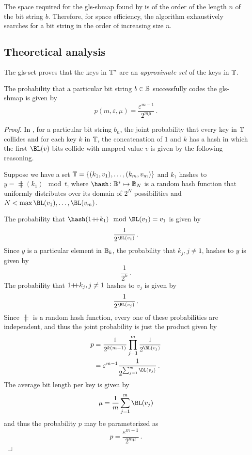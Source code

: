 \documentclass[ ../main.tex]{subfiles}
\begin{document}
The space required for the \gls{gls-shmap} found by  is of the order of the length $n$ of the bit string $b$. Therefore, for space efficiency, the algorithm exhaustively searches for a bit string in the order of increasing size $n$.

\subsection{Theoretical analysis}
The \gls{gls-set} proves that the keys in $\mathbb{T}^*$ are an \emph{approximate set} of the keys in $\mathbb{T}$.

\begin{theorem}
The probability that a particular bit string $b \in \mathbb{B}$ successfully codes the \gls{gls-shmap} is given by
\begin{equation}
    p(m,\varepsilon,\mu) = \frac{\varepsilon^{m-1}}{2^{m \mu}}\,.
\end{equation}
\end{theorem}
\begin{proof}
In , for a particular bit string $b_n$, the joint probability that every key in $\mathbb{T}$ collides and for each key $k$ in $\mathbb{T}$, the concatenation of $1$ and $k$ has a hash in which the first $\BL(v)$ bits collide with mapped value $v$ is given by the following reasoning.

Suppose we have a set $\mathbb{T} = \{(k_1,v_1),\ldots,(k_m,v_m)\}$ and $k_1$ hashes to $y = \hash(k_1) \mod t$, where $\hash \colon \cisb^* \mapsto \cisb_N$ is a random hash function that uniformly distributes over its domain of $2^N$ possibilities and $N < \max{\BL(v_1),\ldots,\BL(v_m)}$.

The probability that $\hash(1 \catop k_1) \mod \BL(v_1) = v_1$ is given by
\begin{equation}
    \frac{1}{2^{\BL(v_1)}}\,.
\end{equation}
Since $y$ is a particular element in $\mathbb{B}_k$, the probability that $k_j, j \neq 1$, hashes to $y$ is given by
\begin{equation}
    \frac{1}{2^k}\,.
\end{equation}
The probability that $1 {+\!\!+} k_j, j \neq 1$ hashes to $v_j$ is given by
\begin{equation}
    \frac{1}{2^{\BL(v_j)}}\,.
\end{equation}
Since $\hash$ is a random hash function, every one of these probabilities are independent, and thus the joint probability is just the product given by
\begin{align}
    p &= \frac{1}{2^{k(m-1)}} \prod_{j=1}^{m} \frac{1}{2^{\BL(v_j)}}\\
      &= \varepsilon^{m-1} \frac{1}{2^{\sum_{j=1}^{m} \BL(v_j)}}\,.
\end{align}
The average bit length per key is given by
\begin{equation}
    \mu = \frac{1}{m} \sum_{j=1}^{m} \BL(v_j)
\end{equation}
and thus the probability $p$ may be parameterized as
\begin{equation}
    p = \frac{\varepsilon^{m-1}}{2^{m \mu}}\,.
\end{equation}
\end{proof}
\end{document}
